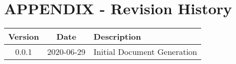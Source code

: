 \newpage
\appendix
\section*{APPENDIX - Revision History}
\label{sec:revisions}
%

\renewcommand{\arraystretch}{1.2}
\begin{table}[H]
	\label{tab:title}
	\begin{tabular}{|c|c|l|}
		\hline
		\textbf{Version} & 
		\textbf{Date} & 
		\textbf{Description} \hfill\\
		\hline
		
		0.0.1 & 2020-06-29 & Initial Document Generation\\
		\hline
	\end{tabular}
\end{table}
